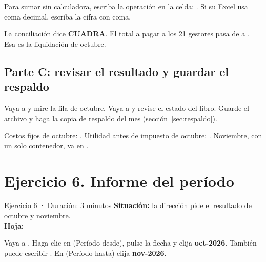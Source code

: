 \begin{consejo}
Para sumar sin calculadora, escriba la operación en la celda: . Si su Excel usa coma decimal, escriba la
cifra con coma.
\end{consejo}


\begin{resultado}
 La conciliación dice \textcolor{verde}{\textbf{CUADRA}}. El total a pagar a los 21 gestores pasa de \vEjCincoPagoTotalAntes{} a
\textbf{\vEjCincoPagoTotal}. Esa es la liquidación de octubre.
\end{resultado}

\subsection*{Parte C: revisar el resultado y guardar el respaldo}
\begin{pasos}
\setcounter{paso}{3}
\paso Vaya a  y mire la fila de octubre.
\paso Vaya a  y revise el estado del libro.
\paso Guarde el archivo y haga la copia de respaldo del mes (sección~\ref{sec:respaldo}).
\end{pasos}


\begin{resultado}
 Costos fijos de octubre: \textbf{\vEjCincoFijosOct}.  Utilidad antes de impuesto de octubre: \textbf{\vEjCincoUAIoct}.
Noviembre, con un solo contenedor, va en \textcolor{red}{\vEjCincoUAInov}.
\end{resultado}

\section{Ejercicio 6. Informe del período}

\begin{ficha}{Ejercicio 6 · Duración: 3 minutos}
\textbf{Situación:} la dirección pide el resultado de octubre y noviembre.\\
\textbf{Hoja:} 
\end{ficha}

\begin{pasos}
\paso Vaya a .
\paso Haga clic en  (Período desde), pulse la flecha y elija \textbf{oct-2026}. También puede escribir .
\paso En  (Período hasta) elija \textbf{nov-2026}.
\end{pasos}

